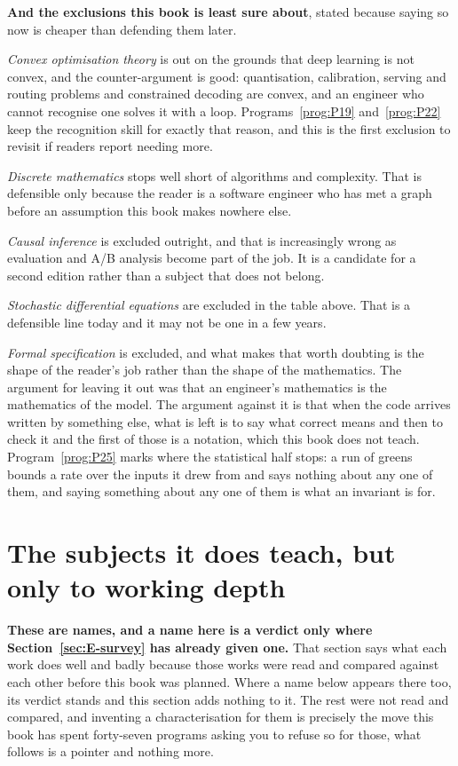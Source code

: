 \medskip
\textbf{And the exclusions this book is least sure about}, stated because
saying so now is cheaper than defending them later.

\emph{Convex optimisation theory} is out on the grounds that deep learning is
not convex, and the counter-argument is good: quantisation, calibration,
serving and routing problems and constrained decoding are convex, and an
engineer who cannot recognise one solves it with a loop.
Programs~\ref{prog:P19} and~\ref{prog:P22} keep the recognition skill for
exactly that reason, and this is the first exclusion to revisit if readers
report needing more.

\emph{Discrete mathematics} stops well short of algorithms and complexity.
That is defensible only because the reader is a software engineer who has met a
graph before \dash{} an assumption this book makes nowhere else.

\emph{Causal inference} is excluded outright, and that is increasingly wrong as
evaluation and A/B analysis become part of the job. It is a candidate for a
second edition rather than a subject that does not belong.

\emph{Stochastic differential equations} are excluded in the table above. That
is a defensible line today and it may not be one in a few years.

\emph{Formal specification} is excluded, and what makes that worth doubting is
the shape of the reader's job rather than the shape of the mathematics. The
argument for leaving it out was that an engineer's mathematics is the
mathematics of the model. The argument against it is that when the code
arrives written by something else, what is left is to say what correct means
and then to check it \dash{} and the first of those is a notation, which this
book does not teach. Program~\ref{prog:P25} marks where the statistical half
stops: a run of greens bounds a rate over the inputs it drew from and says
nothing about any one of them, and saying something about any one of them is
what an invariant is for.

\section{The subjects it does teach, but only to working depth}
\label{sec:E-depth}

\begin{warning}
\textbf{These are names, and a name here is a verdict only where
Section~\ref{sec:E-survey} has already given one.} That section says what each
work does well and badly because those works were read and compared against
each other before this book was planned. Where a name below appears there too,
its verdict stands and this section adds nothing to it. The rest were not read
and compared, and inventing a characterisation for them is precisely the move
this book has spent forty-seven programs asking you to refuse \dash{} so for
those, what follows is a pointer and nothing more.
\end{warning}

